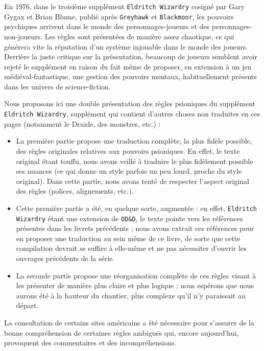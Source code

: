 \documentclass[11pt]{article}
\begin{document}
En 1976, dans le troisième supplément \texttt{Eldritch Wizardry} cosigné par Gary Gygax et Brian Blume, publié après \texttt{Greyhawk} et \texttt{Blackmoor}, les pouvoirs psychiques arrivent dans le monde des personnages-joueurs et des personnages-non-joueurs. Les règles sont présentées de manière assez chaotique, ce qui générera vite la réputation d'un système injouable dans le monde des joueurs. Derrière la juste critique sur la présentation, beaucoup de joueurs semblent avoir rejeté le supplément en raison du fait même de proposer, en extension à un jeu médiéval-fantastique, une gestion des pouvoirs mentaux, habituellement présents dans les univers de science-fiction.

Nous proposons ici une double présentation des règles psioniques du supplément \texttt{Eldritch Wizardry}, supplément qui contient d'autres choses non traduites en ces pages (notamment le Druide, des monstres, etc.) :

\begin{itemize}
\item La première partie propose une traduction complète, la plus fidèle possible, des règles originales relatives aux pouvoirs psioniques. En effet, le texte original étant touffu, nous avons veillé à traduire le plus fidèlement possible ses nuances (ce qui donne un style parfois un peu lourd, proche du style original). Dans cette partie, nous avons tenté de respecter l'aspect original des règles (polices, alignements, etc.).
\item Cette première partie a été, en quelque sorte, \og augmentée \fg{} : en effet, \texttt{Eldritch Wizardry} étant une extension de \texttt{OD\&D}, le texte pointe vers les références présentes dans les livrets précédents ; nous avons extrait ces références pour en proposer une traduction au sein même de ce livre, de sorte que cette compilation devrait se suffire à elle-même et ne pas nécessiter d'ouvrir les ouvrages précédents de la série.
\item La seconde partie propose une réorganisation complète de ces règles visant à les présenter de manière plus claire et plus logique ; nous espérons que nous aurons été à la hauteur du chantier, plus complexe qu'il n'y paraissait au départ.
\end{itemize}

La consultation de certains sites américains a été nécessaire pour s'assurer de la bonne compréhension de certaines règles ambiguës qui, encore aujourd'hui, provoquent des commentaires et des incompréhensions.
\end{document}
